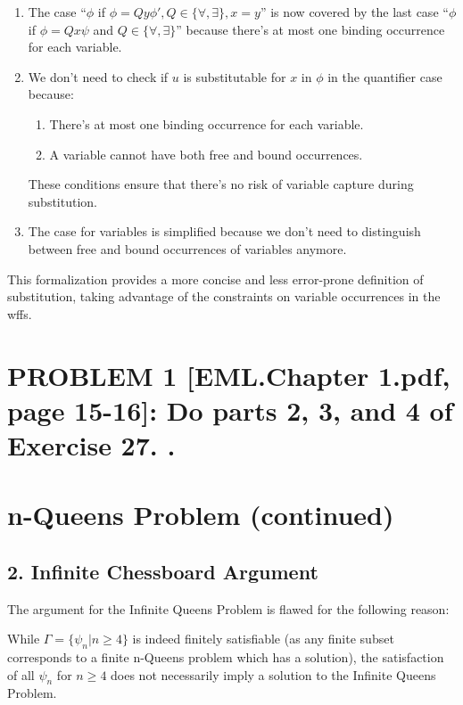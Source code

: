 \documentclass{article}
\begin{document}
\begin{enumerate}
    \item The case ``$\phi$ if $\phi = Qy \phi', Q \in \{\forall, \exists\}, x = y$'' is now covered by the last case ``$\phi$ if $\phi = Qx \psi$ and $Q \in \{\forall, \exists\}$'' because there's at most one binding occurrence for each variable.

    \item We don't need to check if $u$ is substitutable for $x$ in $\phi$ in the quantifier case because:
    \begin{enumerate}
        \item There's at most one binding occurrence for each variable.
        \item A variable cannot have both free and bound occurrences.
    \end{enumerate}
    These conditions ensure that there's no risk of variable capture during substitution.

    \item The case for variables is simplified because we don't need to distinguish between free and bound occurrences of variables anymore.
\end{enumerate}

This formalization provides a more concise and less error-prone definition of substitution, taking advantage of the constraints on variable occurrences in the wffs.

\newpage
\section*{PROBLEM 1 [EML.Chapter 1.pdf, page 15-16]: Do parts 2, 3, and 4 of Exercise 27. .}
\section*{n-Queens Problem (continued)}

\subsection*{2. Infinite Chessboard Argument}

The argument for the Infinite Queens Problem is flawed for the following reason:

While $\Gamma = \{\psi_n | n \geq 4\}$ is indeed finitely satisfiable (as any finite subset corresponds to a finite n-Queens problem which has a solution), the satisfaction of all $\psi_n$ for $n \geq 4$ does not necessarily imply a solution to the Infinite Queens Problem.
\end{document}
